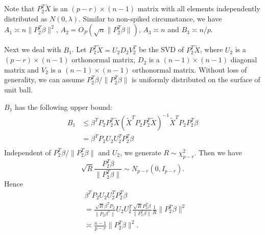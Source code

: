 \documentclass[review]{elsarticle}
\theoremstyle{plain}
\theoremstyle{definition}
\theoremstyle{remark}
\begin{document}

Note that $P_2^T \tilde{X}$ is an $(p-r)\times (n-1)$ matrix with all elements independently distributed as $N(0,\lambda)$. Similar to non-spiked circumstance, we have $A_1\asymp n\|P_2^T\beta\|^2$, $A_2=O_P(\sqrt{n}\|P_2^T \beta\|)$, $A_3\asymp n$ and $B_3\asymp n/p$.

Next we deal with $B_1$.
Let $P_2^T \tilde{X}=U_2 D_2 V_2^T$ be the SVD of $P_2^T \tilde{X}$, where $U_2$ is a $(p-r)\times (n-1)$ orthonormal matrix, $D_2$ is a $(n-1)\times(n-1)$ diagonal matrix and $V_2$ is a $(n-1)\times (n-1)$ orthonormal matrix. Without loss of generality, we can assume $P_2^T \beta/\|P_2^T\beta\|$ is uniformly distributed on the surface of unit ball.

$B_1$ has the following upper bound:
\begin{equation}\label{upperbound}
    \begin{aligned}
        B_1&\leq \beta^T P_2 P_2^T \tilde{X} {(\tilde{X}^T P_2 P_2^T \tilde{X})}^{-1}\tilde{X}^T P_2 P_2^T \beta\\
        &=\beta^T P_2 U_2 U_2^T P_2^T \beta\\
    \end{aligned}
\end{equation}
Independent of $P_2^T\beta/\|P_2^T \beta\|$ and $U_2$, we generate $R\sim \chi^2_{p-r}$. Then we have
\begin{equation*}
    \sqrt{R}\frac{P_2^T \beta}{\|P_2^T \beta\|} \sim N_{p-r}(0,I_{p-r}).
\end{equation*}
Hence
\begin{equation*}
    \begin{aligned}
        &\beta^T P_2 U_2 U_2^T P_2^T \beta\\
        &=\frac{\sqrt{R}\beta^T P_2}{\|P_2 \beta^T\|} U_2 U_2^T \frac{\sqrt{R}P_2^T \beta}{\|P_2^T \beta\|}\frac{1}{R}\|P_2^T \beta\|^2\\
        &\asymp \frac{n-1}{p-r}\|P_2^T\beta\|^2.
    \end{aligned}
\end{equation*}
\end{document}
